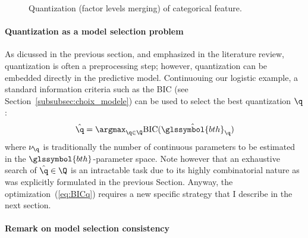 \begin{figure}
\begin{multicols}{2}
\begin{minipage}{0.45\textwidth}
\caption{\label{fig:disc_disc} Quantization (factor levels merging) of categorical feature.}
\end{minipage}
\end{multicols}
\end{figure}




\paragraph{Quantization as a model selection problem} \label{par:model_selec}

As dicussed in the previous section, and emphasized in the literature review, quantization is often a preprocessing step; however, quantization can be embedded directly in the predictive model. Continuouing our logistic example, a standard information criteria such as the BIC (see Section~\ref{subsubsec:choix_modele}) can be used to select the best quantization $\q$:
\begin{equation}
    \label{eq:BICq}
    \hat{\q}=\argmax_{\q \in \Q} \text{BIC}(\hat{\glssymbol{bth}}_\q)
\end{equation}
where $\nu_\q$ is traditionally the number of continuous parameters to be estimated in the $\glssymbol{bth}$-parameter space. Note however that an exhaustive search of $\hat{\q}\in\Q$ is an intractable task due to its highly combinatorial nature as was explicitly formulated in the previous Section. Anyway, the optimization~(\ref{eq:BICq}) requires a new specific strategy that I describe in the next section.

\paragraph{Remark on model selection consistency} \label{par:consistency}

